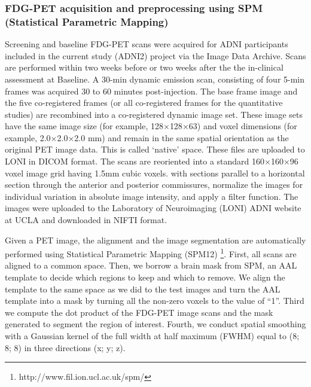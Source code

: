 \documentclass[authoryear,preprint,revi	ew,12pt]{elsarticle}
\begin{document}
\subsubsection{FDG-PET acquisition and preprocessing using SPM (Statistical Parametric Mapping)}
\label{sec:preprocess}
Screening and baseline FDG-PET scans were acquired for ADNI participants included in the current study (ADNI2) project via the Image Data Archive. Scans are performed within two weeks before or two weeks after the the in-clinical assessment at Baseline. A 30-min dynamic emission scan, consisting of four 5-min frames was acquired  30 to 60 minutes post-injection. The base frame image and the five co-registered frames (or all co-registered frames for the quantitative studies) are recombined into a co-registered dynamic image set. These image sets have the same image size (for example, 128$ \times $128$ \times $63) and voxel dimensions (for example, 2.0$ \times $2.0$ \times $2.0 mm) and remain in the same spatial orientation as the original PET image data. This is called ‘native’ space. These files are uploaded to LONI in DICOM format. The scans are reoriented into a standard 160$ \times $160$ \times $96 voxel image grid having 1.5mm cubic voxels. with sections parallel to a horizontal section through the anterior and posterior commissures, normalize the images for individual variation in absolute image intensity, and apply a filter function. The images were uploaded to the Laboratory of Neuroimaging (LONI) ADNI website at UCLA and downloaded in NIFTI format.

Given a PET image, the alignment and the image segmentation are automatically performed using Statistical Parametric Mapping (SPM12) \citep{penny2011statistical}\footnote{http://www.fil.ion.ucl.ac.uk/spm/}. First, all scans are aligned to a common space. Then, we borrow a brain mask from SPM, an AAL template to decide which regions to keep and which to remove. We align the template to the same space as we did to the test images and turn the AAL template into a mask by turning all the non-zero voxels to the value of ``1''. Third we compute the dot product of the FDG-PET image scans and the mask generated to segment the region of interest. Fourth, we conduct spatial smoothing with a Gaussian kernel of the full width at half maximum (FWHM) equal to (8; 8; 8) in three directions (x; y; z).

\end{document}
